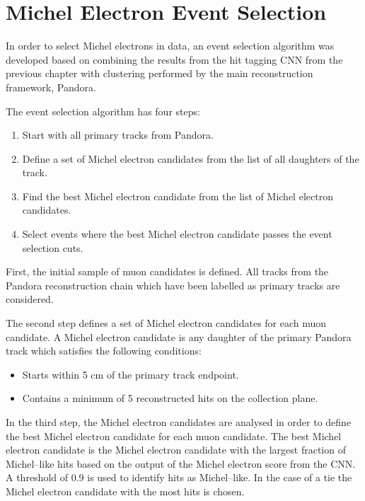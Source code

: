 \section{Michel Electron Event Selection} \label{ME_ES}
In order to select Michel electrons in \protodune{} data, an event selection
algorithm was developed based on combining the results from the hit tagging CNN 
from the previous chapter with clustering performed by the main \protodune{} 
reconstruction framework, Pandora. 

The event selection algorithm has four steps:
\begin{enumerate}
	\item Start with all primary tracks from Pandora.
	\item Define a set of Michel electron candidates from the list of all
		daughters of the track.
	\item Find the best Michel electron candidate from the list of Michel electron
		candidates.
	\item Select events where the best Michel electron candidate passes the event
		selection cuts.
\end{enumerate}

First, the initial sample of muon candidates is defined. All tracks from the 
Pandora reconstruction chain which have been labelled as primary tracks are 
considered.

The second step defines a set of Michel electron candidates for each muon
candidate. A Michel electron candidate is any daughter of the primary Pandora
track which satisfies the following conditions:
\begin{itemize}
	\item Starts within 5 cm of the primary track endpoint.
	\item Contains a minimum of 5 reconstructed hits on the collection plane.
\end{itemize}

In the third step, the Michel electron candidates are analysed in order to 
define the best Michel electron candidate for each muon candidate. The best 
Michel electron candidate is the Michel electron candidate with the largest 
fraction of Michel--like hits based on the output of the Michel electron score 
from the CNN. A threshold of 0.9 is used to identify hits as Michel--like. In 
the case of a tie the Michel electron candidate with the most hits is chosen.

